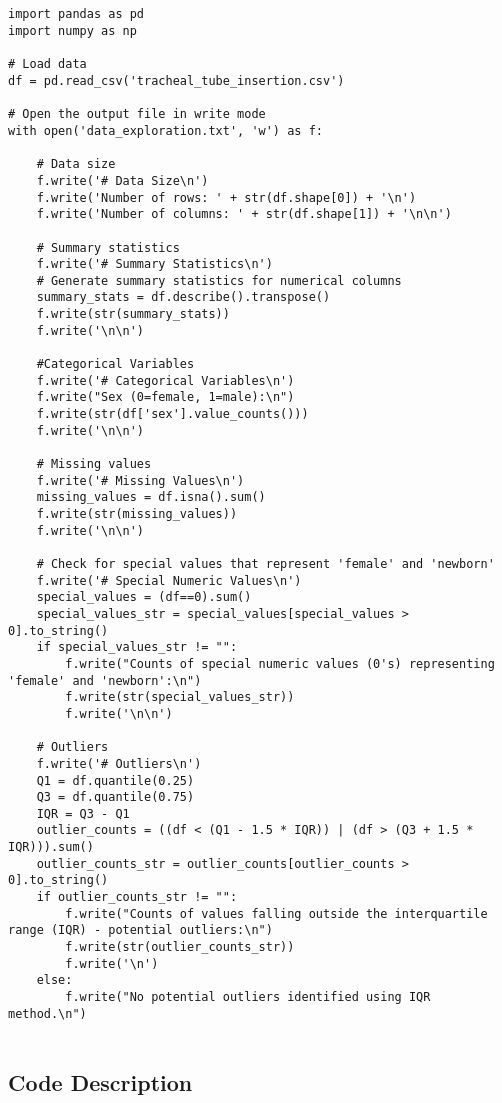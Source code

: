 \documentclass[11pt]{article}
\begin{document}
\begin{verbatim}


import pandas as pd
import numpy as np

# Load data
df = pd.read_csv('tracheal_tube_insertion.csv')

# Open the output file in write mode
with open('data_exploration.txt', 'w') as f:

    # Data size
    f.write('# Data Size\n')
    f.write('Number of rows: ' + str(df.shape[0]) + '\n')
    f.write('Number of columns: ' + str(df.shape[1]) + '\n\n')

    # Summary statistics
    f.write('# Summary Statistics\n')
    # Generate summary statistics for numerical columns
    summary_stats = df.describe().transpose() 
    f.write(str(summary_stats))
    f.write('\n\n')
    
    #Categorical Variables
    f.write('# Categorical Variables\n')
    f.write("Sex (0=female, 1=male):\n")
    f.write(str(df['sex'].value_counts()))
    f.write('\n\n')
    
    # Missing values
    f.write('# Missing Values\n')
    missing_values = df.isna().sum() 
    f.write(str(missing_values))
    f.write('\n\n')
    
    # Check for special values that represent 'female' and 'newborn'
    f.write('# Special Numeric Values\n')
    special_values = (df==0).sum()
    special_values_str = special_values[special_values > 0].to_string()
    if special_values_str != "":
        f.write("Counts of special numeric values (0's) representing 'female' and 'newborn':\n")
        f.write(str(special_values_str))
        f.write('\n\n')

    # Outliers
    f.write('# Outliers\n')
    Q1 = df.quantile(0.25)
    Q3 = df.quantile(0.75)
    IQR = Q3 - Q1
    outlier_counts = ((df < (Q1 - 1.5 * IQR)) | (df > (Q3 + 1.5 * IQR))).sum()
    outlier_counts_str = outlier_counts[outlier_counts > 0].to_string()
    if outlier_counts_str != "":
        f.write("Counts of values falling outside the interquartile range (IQR) - potential outliers:\n")
        f.write(str(outlier_counts_str))
        f.write('\n')
    else:
        f.write("No potential outliers identified using IQR method.\n")
        

\end{verbatim}

\subsection{Code Description}
\end{document}
